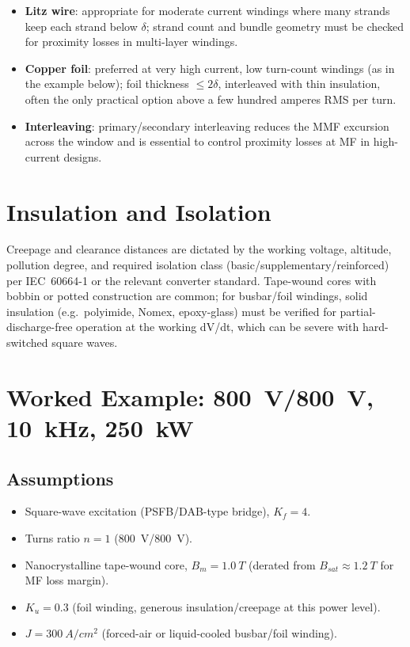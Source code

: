 \documentclass[11pt,a4paper]{article}
\begin{document}
\begin{itemize}
    \item \textbf{Litz wire}: appropriate for moderate current windings where many
    strands keep each strand below $\delta$; strand count and bundle geometry must
    be checked for proximity losses in multi-layer windings.
    \item \textbf{Copper foil}: preferred at very high current, low turn-count
    windings (as in the example below); foil thickness $\le 2\delta$, interleaved
    with thin insulation, often the only practical option above a few hundred
    amperes RMS per turn.
    \item \textbf{Interleaving}: primary/secondary interleaving reduces the MMF
    excursion across the window and is essential to control proximity losses at
    MF in high-current designs.
\end{itemize}

\section{Insulation and Isolation}
Creepage and clearance distances are dictated by the working voltage, altitude,
pollution degree, and required isolation class (basic/supplementary/reinforced)
per IEC~60664-1 or the relevant converter standard. Tape-wound cores with bobbin
or potted construction are common; for busbar/foil windings, solid insulation
(e.g.\ polyimide, Nomex, epoxy-glass) must be verified for partial-discharge-free
operation at the working dV/dt, which can be severe with hard-switched square waves.

\section{Worked Example: \SI{800}{V}/\SI{800}{V}, \SI{10}{kHz}, \SI{250}{kW}}

\subsection*{Assumptions}
\begin{itemize}
    \item Square-wave excitation (PSFB/DAB-type bridge), $K_f = 4$.
    \item Turns ratio $n=1$ (\SI{800}{V}/\SI{800}{V}).
    \item Nanocrystalline tape-wound core, $B_m = \SI{1.0}{T}$ (derated from
    $B_{sat}\approx\SI{1.2}{T}$ for MF loss margin).
    \item $K_u = 0.3$ (foil winding, generous insulation/creepage at this power level).
    \item $J = \SI{300}{A/cm^2}$ (forced-air or liquid-cooled busbar/foil winding).
\end{itemize}
\end{document}
